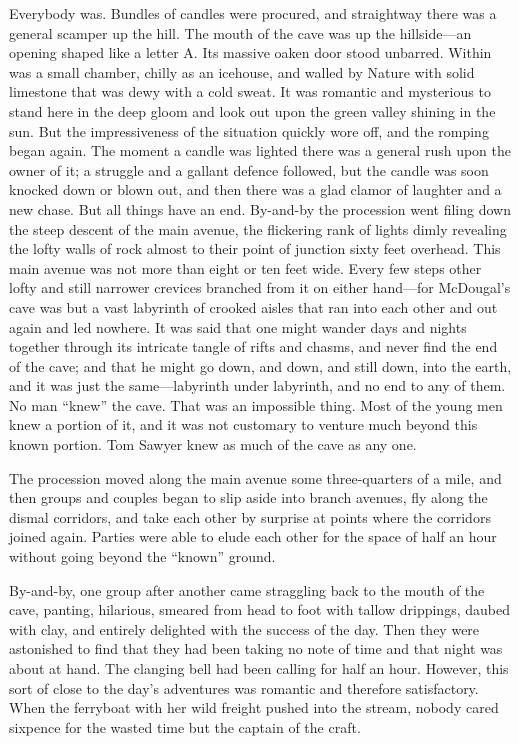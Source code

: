\documentclass{book}
\begin{document}
Everybody was. Bundles of candles were procured, and straightway there was a general scamper up the hill. The mouth of the cave was up the hillside—an opening shaped like a letter A. Its massive oaken door stood unbarred. Within was a small chamber, chilly as an icehouse, and walled by Nature with solid limestone that was dewy with a cold sweat. It was romantic and mysterious to stand here in the deep gloom and look out upon the green valley shining in the sun. But the impressiveness of the situation quickly wore off, and the romping began again. The moment a candle was lighted there was a general rush upon the owner of it; a struggle and a gallant defence followed, but the candle was soon knocked down or blown out, and then there was a glad clamor of laughter and a new chase. But all things have an end. By-and-by the procession went filing down the steep descent of the main avenue, the flickering rank of lights dimly revealing the lofty walls of rock almost to their point of junction sixty feet overhead. This main avenue was not more than eight or ten feet wide. Every few steps other lofty and still narrower crevices branched from it on either hand—for McDougal’s cave was but a vast labyrinth of crooked aisles that ran into each other and out again and led nowhere. It was said that one might wander days and nights together through its intricate tangle of rifts and chasms, and never find the end of the cave; and that he might go down, and down, and still down, into the earth, and it was just the same—labyrinth under labyrinth, and no end to any of them. No man “knew” the cave. That was an impossible thing. Most of the young men knew a portion of it, and it was not customary to venture much beyond this known portion. Tom Sawyer knew as much of the cave as any one.

The procession moved along the main avenue some three-quarters of a mile, and then groups and couples began to slip aside into branch avenues, fly along the dismal corridors, and take each other by surprise at points where the corridors joined again. Parties were able to elude each other for the space of half an hour without going beyond the “known” ground.

By-and-by, one group after another came straggling back to the mouth of the cave, panting, hilarious, smeared from head to foot with tallow drippings, daubed with clay, and entirely delighted with the success of the day. Then they were astonished to find that they had been taking no note of time and that night was about at hand. The clanging bell had been calling for half an hour. However, this sort of close to the day’s adventures was romantic and therefore satisfactory. When the ferryboat with her wild freight pushed into the stream, nobody cared sixpence for the wasted time but the captain of the craft.
\end{document}

